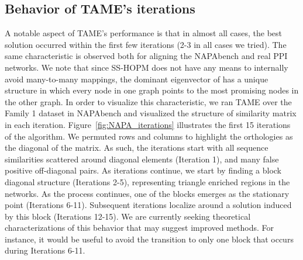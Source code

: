 \documentclass[10pt, journal, compsoc, final]{IEEEtran}
\begin{document}
\subsection{Behavior of TAME's iterations}
A notable aspect of TAME's performance is that in almost all cases, the best solution occurred
within the first few iterations (2-3 in all cases we tried). The same characteristic is observed both for aligning the NAPAbench and 
real PPI networks. We note that since SS-HOPM does not have any means to internally avoid 
many-to-many mappings, the dominant eigenvector of  has a unique structure in which 
every node in one graph points to the most promising nodes in the other graph. In order to 
visualize this characteristic, we ran TAME over the Family 1 dataset in NAPAbench and visualized the 
structure of similarity matrix in each iteration. Figure~\ref{fig:NAPA_iterations} illustrates the 
first 15 iterations of the algorithm. We permuted rows and columns to highlight the orthologies as
the diagonal of the matrix. As such, the iterations start with all sequence similarities scattered around 
diagonal elements (Iteration 1), and many false positive off-diagonal pairs. As iterations continue, we start 
by finding a block diagonal structure (Iterations 2-5), representing triangle enriched regions in the networks.
As the process continues, one of the blocks emerges as the stationary point (Iterations 6-11).
Subsequent iterations localize around a solution induced by this block (Iterations 12-15). We are 
currently seeking theoretical characterizations of this behavior that may suggest improved methods.
For instance, it would be useful to avoid the transition to only one block that occurs during
Iterations 6-11.
\end{document}
